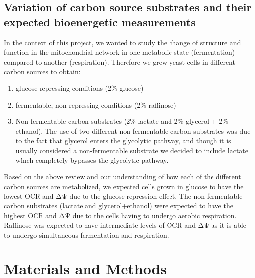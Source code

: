 \subsection{Variation of carbon source substrates and their expected bioenergetic measurements}\label{sec:carbon}
In the context of this project, we wanted to study the change of structure and function in the mitochondrial network in one metabolic state (fermentation) compared to another (respiration). Therefore we grew yeast cells in different carbon sources to obtain:
\begin{enumerate}[label=\emph{\alph*}), leftmargin=*, itemindent=0pc]
\item glucose repressing conditions (2\% glucose)
\item fermentable, non repressing conditions (2\% raffinose)
\item Non-fermentable carbon substrates (2\% lactate and 2\% glycerol + 2\% ethanol). The use of two different non-fermentable carbon substrates was due to the fact that glycerol enters the glycolytic pathway, and though it is usually considered a non-fermentable substrate we decided to include lactate which completely bypasses the glycolytic pathway. 
\end{enumerate}
Based on the above review and our understanding of how each of the different carbon sources are metabolized, we expected cells grown in glucose to have the lowest OCR and ΔΨ due to the glucose repression effect. The non-fermentable carbon substrates (lactate and glycerol+ethanol) were expected to have the highest OCR and ΔΨ due to the cells having to undergo aerobic respiration. Raffinose was expected to have intermediate levels of OCR and ΔΨ as it is able to undergo simultaneous fermentation and respiration.
\section{Materials and Methods}
